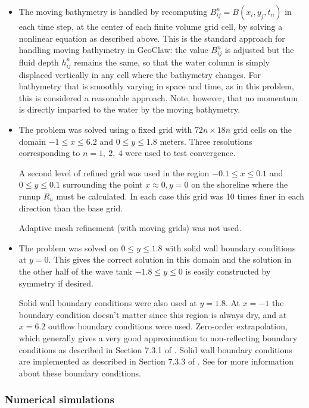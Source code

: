 \begin{itemize}
\item  The moving bathymetry is handled by recomputing $B_{ij}^n =
B(x_i,y_j,t_n)$ in
each time step, at the center of each finite volume grid cell, by solving a
nonlinear equation as described above.  This is the standard approach
for handling moving bathymetry in GeoClaw:  the value $B_{ij}^n$ is adjusted
but the fluid depth $h_{ij}^n$ remains the same, so that the water column is
simply displaced vertically in any cell where the bathymetry changes.  For
bathymetry that is smoothly varying  in space and time, as in this problem,
this is considered a reasonable approach.  Note, however, that no momentum
is directly imparted to the water by the moving bathymetry.  

\item The problem was solved using a fixed grid with $72n \times 18n$ grid
cells on the domain $-1\leq x \leq 6.2$ and $0\leq y \leq 1.8$ meters.
Three resolutions corresponding to $n=1,~2,~4$ were used to test
convergence.

A second level of refined grid was used in the region $-0.1\leq x \leq 0.1$
and $0\leq y \leq 0.1$ surrounding the point $x\approx 0, y=0$
on the shoreline where the runup $R_u$ must be calculated.  In each case
this grid was 10 times finer in each direction than the base grid.  

Adaptive mesh refinement (with moving grids) was not used.

\item The problem was solved on $0\leq y \leq 1.8$ with solid wall boundary
conditions at $y=0$.  This gives the correct solution in this
domain and the solution in the other half of the wave tank $-1.8\leq y\leq
0$  is easily constructed by symmetry if desired.

Solid wall boundary conditions were also used at $y=1.8$.  At $x=-1$ the
boundary condition doesn't matter since this region is always dry, and at
$x=6.2$ outflow boundary conditions were used.  Zero-order extrapolation,
which generally gives a very good approximation to non-reflecting boundary
conditions as described in Section 7.3.1 of \cite{rjl:fvmhp}.  Solid wall
boundary conditions are implemented as described in Section 7.3.3 of
\cite{rjl:fvmhp}.  See  for more information about these
boundary conditions.


\end{itemize} 


\subsubsection{Numerical simulations}

